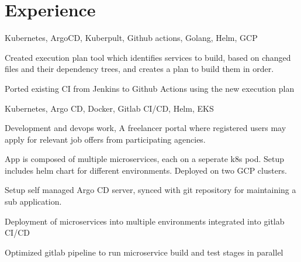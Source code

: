 \documentclass[]{font}
\begin{document}
\begin{minipage}[t]{0.66\textwidth} 


\section{Experience}


Kubernetes, ArgoCD, Kuberpult, Github actions, Golang, Helm, GCP
\vspace{\topsep}

\begin{tightemize}
\item Created execution plan tool which identifies services to build, based on changed files and their dependency trees, and creates a plan to build them in order. 
\item Ported existing CI from Jenkins to Github Actions using the new execution plan
\end{tightemize}
\sectionsep


Kubernetes, Argo CD, Docker, Gitlab CI/CD, Helm, EKS
\vspace{\topsep}


\begin{tightemize}
\item Development and devops work, A freelancer portal where registered users may apply for relevant job offers from participating agencies.
\item App is composed of multiple microservices, each on a seperate k8s pod. Setup includes helm chart for different environments. Deployed on two GCP clusters.
\item Setup self managed Argo CD server, synced with git repository for maintaining a sub application.
\item Deployment of microservices into multiple environments integrated into gitlab CI/CD
\item Optimized gitlab pipeline to run microservice build and test stages in parallel
\end{tightemize}


\end{minipage}
\end{document}

